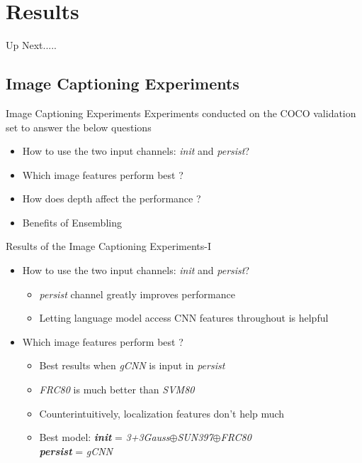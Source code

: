 \documentclass{beamer}
\begin{document}
\section{Results}
\begin{frame}{Up Next.....}
\tableofcontents[currentsection] 
\end{frame}
\subsection{Image Captioning Experiments}
\begin{frame}{Image Captioning Experiments}
Experiments conducted on the COCO validation set to answer the below questions
\begin{itemize}
    \item How to use the two input channels: \emph{init} and \emph{persist}?
    \item Which image features perform best ?
    \item How does depth affect the performance ?
    \item Benefits of Ensembling  
\end{itemize}
\end{frame}
\begin{frame}{Results of the Image Captioning Experiments-I}
\begin{itemize}
    \item<1-> How to use the two input channels: \emph{init} and \emph{persist}?
       \begin{itemize}
           \item<2-> \emph{persist} channel greatly improves performance
           \item<3-> Letting language model access CNN features throughout is helpful 
       \end{itemize}
    \item<1-> Which image features perform best ?
       \begin{itemize}
           \item<4-> Best results when \emph{gCNN} is input in \emph{persist} 
           \item<5-> \emph{FRC80} is much better than \emph{SVM80}
           \item<6-> Counterintuitively, localization features don't help much 
           \item<7-> Best model: \textbf{\emph{init}} = \emph{3+3Gauss$\oplus$SUN397$\oplus$FRC80}\\ \textbf{\emph{persist}} = \emph{gCNN}
       \end{itemize}
\end{itemize}
\end{frame}
\end{document}
